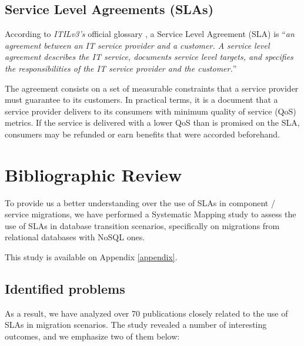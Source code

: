 \documentclass{article}
\begin{document}
\subsection*{Service Level Agreements (SLAs)}
According to \textit{ITILv3's} official glossary \cite{itilv3glossary}, a Service Level Agreement (SLA) is ``\textit{an agreement between an IT service provider and a customer. 
A service level agreement describes the IT service, documents service level targets, and specifies the responsibilities of the IT service provider and the customer.}'' 

The agreement consists on a set of measurable constraints that a service provider must guarantee to its customers.
In practical terms, it is a document that a service provider delivers to its consumers with minimum quality of service (QoS) metrics. 
If the service is delivered with a lower QoS than is promised on the SLA, consumers may be refunded or earn benefits that were accorded beforehand.    

\section{Bibliographic Review}\label{bibreview}

To provide us a better understanding over the use of SLAs in component / service migrations, we have performed a Systematic Mapping study to assess the use of SLAs in database transition scenarios, specifically on migrations from relational databases with NoSQL ones. 

This study is available on Appendix \ref{appendix}. 

\subsection{Identified problems}

As a result, we have analyzed over 70 publications closely related to the use of SLAs in migration scenarios. The study revealed a number of interesting outcomes, and we emphasize two of them below:
\end{document}
